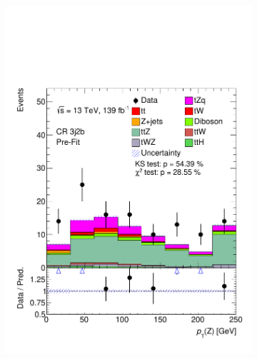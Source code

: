 \begin{figure}[!h]
\begin{subfigure}[b]{0.33\linewidth}
    \includegraphics[width=\linewidth]{ubonn-thesis/Chapters/Chapters_06/Figure/Input_distribution/CR_3j2b_Z_pt.pdf} 
  \end{subfigure} 
  \begin{subfigure}[b]{0.33\linewidth}
    \centering

\end{subfigure}
\end{figure}
